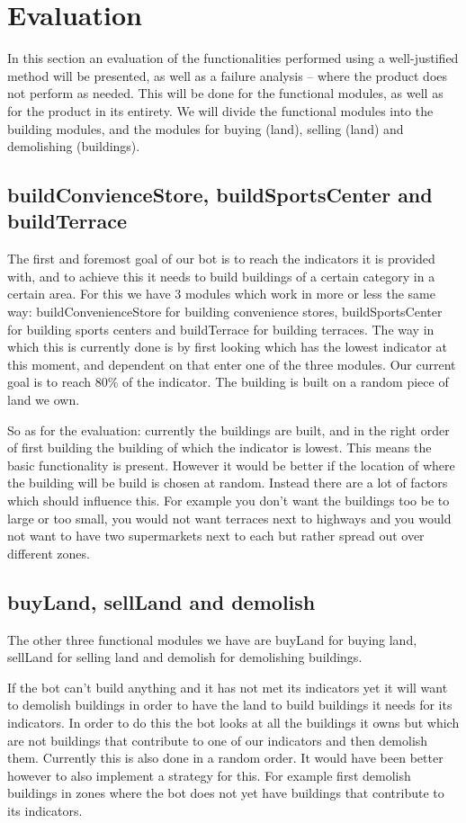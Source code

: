 \section{Evaluation}
In this section an evaluation of the functionalities performed using a well-justified method will be presented, as well as a failure analysis – where the product does not perform as needed. This will be done for the functional modules, as well as for the product in its entirety. We will divide the functional modules into the building modules, and the modules for buying (land), selling (land) and demolishing (buildings).
\subsection{buildConvienceStore, buildSportsCenter and buildTerrace}
The first and foremost goal of our bot is to reach the indicators it is provided with, and to achieve this it needs to build buildings of a certain category in a certain area. For this we have 3 modules which work in more or less the same way: buildConvenienceStore for building convenience stores, buildSportsCenter for building sports centers and buildTerrace for building terraces. The way in which this is currently done is by first looking which has the lowest indicator at this moment, and dependent on that enter one of the three modules. Our current goal is to reach 80\% of the indicator. The building is built on a random piece of land we own. 

So as for the evaluation: currently the buildings are built, and in the right order of first building the building of which the indicator is lowest. This means the basic functionality is present. However it would be better if the location of where the building will be build is chosen at random. Instead there are a lot of factors which should influence this. For example you don't want the buildings too be to large or too small, you would not want terraces next to highways and you would not want to have two supermarkets next to each but rather spread out over different zones.

\subsection{buyLand, sellLand and demolish}
The other three functional modules we have are buyLand for buying land, sellLand for selling land and demolish for demolishing buildings. 

If the bot can't build anything and it has not met its indicators yet it will want to demolish buildings in order to have the land to build buildings it needs for its indicators. In order to do this the bot looks at all the buildings it owns but which are not buildings that contribute to one of our indicators and then demolish them. Currently this is also done in a random order. It would have been better however to also implement a strategy for this. For example first demolish buildings in zones where the bot does not yet have buildings that contribute to its indicators. 

